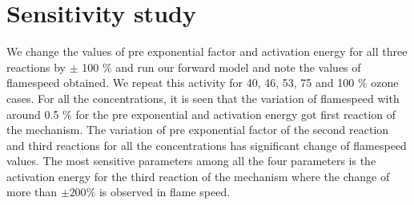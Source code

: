 \section{Sensitivity study}

  We
 change the values of pre exponential factor and activation energy for
 all three reactions by $\pm$ 100 $\% $ and run our forward model and
 note the values of flamespeed obtained. We repeat this activity for
 40, 46, 53, 75 and 100 $\%$ ozone cases. For all the concentrations,
 it is seen that the variation of flamespeed with around 0.5 $\%$ for
 the pre exponential and activation energy got first reaction of the
 mechanism. The variation of pre exponential factor of the second
 reaction and third reactions for all the concentrations has
 significant change of flamespeed values. The most sensitive
 parameters among all the four parameters is the activation energy for
 the third reaction of the mechanism where the change of more than
 $\pm 200\%$ is observed in flame speed.

